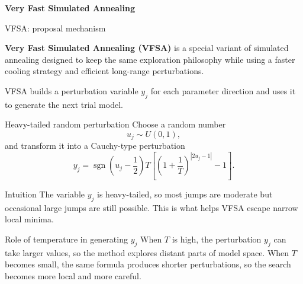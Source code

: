 \documentclass[aspectratio=169]{beamer}
\begin{document}
\begin{frame}[plain]
\centering
\vfill
{\LARGE\textbf{Very Fast Simulated Annealing}}
\vfill
\end{frame}


\begin{frame}{VFSA: proposal mechanism}
\small

\textbf{Very Fast Simulated Annealing (VFSA)} is a special variant of simulated annealing designed to keep the same exploration philosophy while using a faster cooling strategy and efficient long-range perturbations.

\vspace{0.1cm}

VFSA builds a perturbation variable $y_j$ for each parameter direction and uses it to generate the next trial model.

\begin{block}{Heavy-tailed random perturbation}
Choose a random number
\[
u_j \sim U(0,1),
\]
and transform it into a Cauchy-type perturbation
\[
y_j
=
\operatorname{sgn}\!\left(u_j-\frac{1}{2}\right)
T\left[
\left(1+\frac{1}{T}\right)^{|2u_j-1|}-1
\right].
\]
\end{block}

\begin{alertblock}{Intuition}
The variable $y_j$ is heavy-tailed, so most jumps are moderate but occasional large jumps are still possible. This is what helps VFSA escape narrow local minima.
\end{alertblock}

\begin{alertblock}{Role of temperature in generating $y_j$}
When $T$ is high, the perturbation $y_j$ can take larger values, so the method explores distant parts of model space. When $T$ becomes small, the same formula produces shorter perturbations, so the search becomes more local and more careful.
\end{alertblock}
\end{frame}
\end{document}
